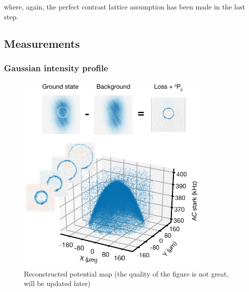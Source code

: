 	\noindent where, again, the perfect contrast lattice assumption has been made in the last step. 









\subsection{Measurements}
	\subsubsection{Gaussian intensity profile}

		\begin{figure}
		    \centering
		    \includegraphics[scale=1.5]{figures/potential_map.pdf}
		    \caption{Reconstructed potential map (the quality of the figure is not great, will be updated later)}
		    \label{fig:potential_map}
		\end{figure}

